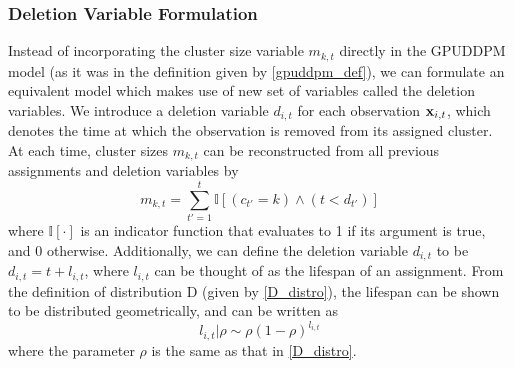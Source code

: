 \documentclass[twocolumn, final]{svjour3}
\begin{document}
\subsubsection{Deletion Variable Formulation}
\label{sec:deletionvariableformulation}

Instead of incorporating the cluster size variable $m_{k,t}$ directly in the GPUDDPM model (as it was in the definition given by \eqref{gpuddpm_def}), we can formulate an equivalent model which makes use of new set of variables called the deletion variables. We introduce a deletion variable $d_{i,t}$ for each observation $\bold{x}_{i,t}$, which denotes the time at which the observation is removed from its assigned cluster. At each time, cluster sizes $m_{k,t}$ can be reconstructed from all previous assignments and deletion variables by
\begin{equation}
\label{compute_clust_size}
m_{k,t} = \sum_{t' = 1}^{t} \mathbb{I}[(c_{t'}=k) \wedge (t < d_{t'})]
\end{equation}
where $\mathbb{I}[\cdot]$ is an indicator function that evaluates to 1 if its argument is true, and 0 otherwise. Additionally, we can define the deletion variable $d_{i,t}$ to be $d_{i,t} = t + l_{i,t}$, where $l_{i,t}$ can be thought of as the lifespan of an assignment. From the definition of distribution D (given by \eqref{D_distro}), the lifespan can be shown to be distributed geometrically, and can be written as
\begin{equation}
\label{del_rho_form}
l_{i,t} | \rho  \sim  \rho(1 - \rho)^{l_{i,t}}
\end{equation}
where the parameter $\rho$ is the same as that in \eqref{D_distro}.
\end{document}

